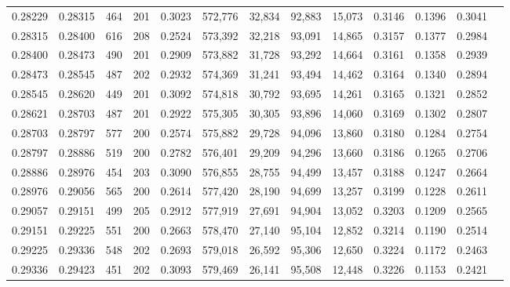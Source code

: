 \begin{tabular}{rrrrrrrrrrrrr}
0.28229 & 0.28315 &   464 & 201 &                                     0.3023 & 572,776 &  32,834 &  92,883 &  15,073 & 0.3146 & 0.1396 & 0.3041 \\
0.28315 & 0.28400 &   616 & 208 &                                     0.2524 & 573,392 &  32,218 &  93,091 &  14,865 & 0.3157 & 0.1377 & 0.2984 \\
0.28400 & 0.28473 &   490 & 201 &                                     0.2909 & 573,882 &  31,728 &  93,292 &  14,664 & 0.3161 & 0.1358 & 0.2939 \\
0.28473 & 0.28545 &   487 & 202 &                                     0.2932 & 574,369 &  31,241 &  93,494 &  14,462 & 0.3164 & 0.1340 & 0.2894 \\
0.28545 & 0.28620 &   449 & 201 &                                     0.3092 & 574,818 &  30,792 &  93,695 &  14,261 & 0.3165 & 0.1321 & 0.2852 \\
0.28621 & 0.28703 &   487 & 201 &                                     0.2922 & 575,305 &  30,305 &  93,896 &  14,060 & 0.3169 & 0.1302 & 0.2807 \\
0.28703 & 0.28797 &   577 & 200 &                                     0.2574 & 575,882 &  29,728 &  94,096 &  13,860 & 0.3180 & 0.1284 & 0.2754 \\
0.28797 & 0.28886 &   519 & 200 &                                     0.2782 & 576,401 &  29,209 &  94,296 &  13,660 & 0.3186 & 0.1265 & 0.2706 \\
0.28886 & 0.28976 &   454 & 203 &                                     0.3090 & 576,855 &  28,755 &  94,499 &  13,457 & 0.3188 & 0.1247 & 0.2664 \\
0.28976 & 0.29056 &   565 & 200 &                                     0.2614 & 577,420 &  28,190 &  94,699 &  13,257 & 0.3199 & 0.1228 & 0.2611 \\
0.29057 & 0.29151 &   499 & 205 &                                     0.2912 & 577,919 &  27,691 &  94,904 &  13,052 & 0.3203 & 0.1209 & 0.2565 \\
0.29151 & 0.29225 &   551 & 200 &                                     0.2663 & 578,470 &  27,140 &  95,104 &  12,852 & 0.3214 & 0.1190 & 0.2514 \\
0.29225 & 0.29336 &   548 & 202 &                                     0.2693 & 579,018 &  26,592 &  95,306 &  12,650 & 0.3224 & 0.1172 & 0.2463 \\
0.29336 & 0.29423 &   451 & 202 &                                     0.3093 & 579,469 &  26,141 &  95,508 &  12,448 & 0.3226 & 0.1153 & 0.2421 \\

\end{tabular}
